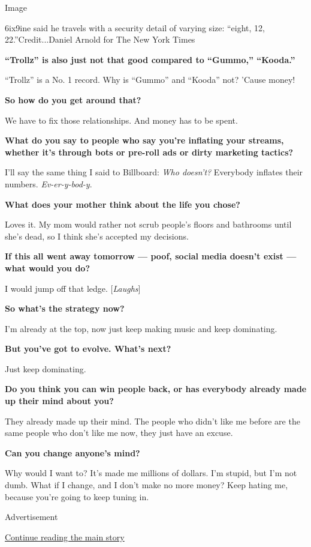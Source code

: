 Image

6ix9ine said he travels with a security detail of varying size: ``eight,
12, 22.''Credit...Daniel Arnold for The New York Times

\textbf{``Trollz'' is also just not that good compared to ``Gummo,''
``Kooda.''}

``Trollz'' is a No. 1 record. Why is ``Gummo'' and ``Kooda'' not? 'Cause
money!

\textbf{So how do you get around that?}

We have to fix those relationships. And money has to be spent.

\textbf{What do you say to people who say you're inflating your streams,
whether it's through bots or pre-roll ads or dirty marketing tactics?}

I'll say the same thing I said to Billboard: \emph{Who doesn't?}
Everybody inflates their numbers. \emph{Ev-er-y-bod-y}.

\textbf{What does your mother think about the life you chose?}

Loves it. My mom would rather not scrub people's floors and bathrooms
until she's dead, so I think she's accepted my decisions.

\textbf{If this all went away tomorrow --- poof, social media doesn't
exist --- what would you do?}

I would jump off that ledge. {[}\emph{Laughs}{]}

\textbf{So what's the strategy now?}

I'm already at the top, now just keep making music and keep dominating.

\textbf{But you've got to evolve. What's next?}

Just keep dominating.

\textbf{Do you think you can win people back, or has everybody already
made up their mind about you?}

They already made up their mind. The people who didn't like me before
are the same people who don't like me now, they just have an excuse.

\textbf{Can you change anyone's mind?}

Why would I want to? It's made me millions of dollars. I'm stupid, but
I'm not dumb. What if I change, and I don't make no more money? Keep
hating me, because you're going to keep tuning in.

Advertisement

\protect\hyperlink{after-bottom}{Continue reading the main story}

